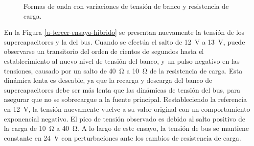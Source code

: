 \begin{figure}[hbt!]
  \centering
  \caption{Formas de onda con variaciones de tensión de banco y resistencia de carga.}
  \label{tercer-ensayo-hibrido}
\end{figure}

En la Figura \ref{u-tercer-ensayo-hibrido} se presentan nuevamente la tensión de los supercapacitores y la del bus. Cuando se efectúa el salto de \SI{12}{\volt} a \SI{13}{\volt}, puede observarse un transitorio del orden de cientos de segundos hasta el establecimiento al nuevo nivel de tensión del banco, y un pulso negativo en las tensiones, causado por un salto de \SI{40}{\ohm} a \SI{10}{\ohm} de la resistencia de carga. Esta dinámica lenta es deseable, ya que la recarga y descarga del banco de supercapacitores debe ser más lenta que las dinámicas de tensión del bus, para asegurar que no se sobrecargue a la fuente principal. Restableciendo la referencia en \SI{12}{\volt}, la tensión nuevamente vuelve a su valor original con un comportamiento exponencial negativo. El pico de tensión observado es debido al salto positivo de la carga de \SI{10}{\ohm} a \SI{40}{\ohm}. A lo largo de este ensayo, la tensión de bus se mantiene constante en \SI{24}{\volt} con perturbaciones ante los cambios de resistencia de carga.

